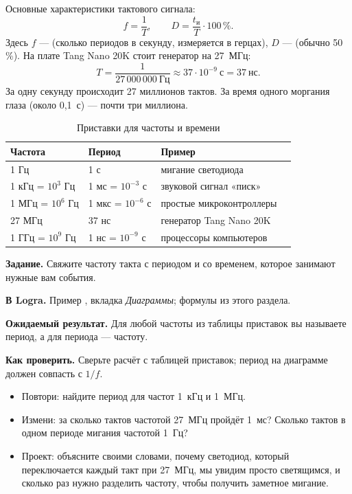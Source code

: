 Основные характеристики тактового сигнала:
\[
  f = \frac{1}{T}, \qquad D = \frac{t_\text{и}}{T}\cdot 100\,\%.
\]
Здесь $f$ ---  (сколько периодов в секунду, измеряется в герцах),
$D$ ---  (обычно 50\,\%). На плате Tang Nano 20K
стоит генератор на 27~МГц:
\[
  T = \frac{1}{27\,000\,000\ \text{Гц}} \approx 37 \cdot 10^{-9}\ \text{с} = 37\ \text{нс}.
\]
За одну секунду происходит 27 миллионов тактов. За время одного моргания глаза
(около 0,1~с) --- почти три миллиона.

\begin{table}[H]
\centering
\caption{Приставки для частоты и времени}
\begin{tabular}{l l l l}
\toprule
\textbf{Частота} & \textbf{Период} & \textbf{Пример} \\
\midrule
1 Гц  & 1 с   & мигание светодиода \\
1 кГц = $10^3$ Гц & 1 мс = $10^{-3}$ с & звуковой сигнал «писк» \\
1 МГц = $10^6$ Гц & 1 мкс = $10^{-6}$ с & простые микроконтроллеры \\
27 МГц & 37 нс & генератор Tang Nano 20K \\
1 ГГц = $10^9$ Гц & 1 нс = $10^{-9}$ с & процессоры компьютеров \\
\bottomrule
\end{tabular}
\end{table}

\begin{diybox}
\textbf{Задание.} Свяжите частоту такта с периодом и со временем, которое
занимают нужные вам события.\par
\textbf{В Logra.} Пример , вкладка \emph{Диаграммы}; формулы из
этого раздела.\par
\textbf{Ожидаемый результат.} Для любой частоты из таблицы приставок вы
называете период, а для периода --- частоту.\par
\textbf{Как проверить.} Сверьте расчёт с таблицей приставок; период на
диаграмме должен совпасть с $1/f$.
\begin{itemize}[leftmargin=3.4em,labelwidth=3em,labelsep=0.4em,align=left]
  \item[\stars{1}] Повтори: найдите период для частот 1~кГц и 1~МГц.
  \item[\stars{2}] Измени: за сколько тактов частотой 27~МГц пройдёт 1~мс?
    Сколько тактов в одном периоде мигания частотой 1~Гц?
  \item[\stars{3}] Проект: объясните своими словами, почему светодиод, который
    переключается каждый такт при 27~МГц, мы увидим просто светящимся, и
    сколько раз нужно разделить частоту, чтобы получить заметное мигание.
\end{itemize}
\end{diybox}

